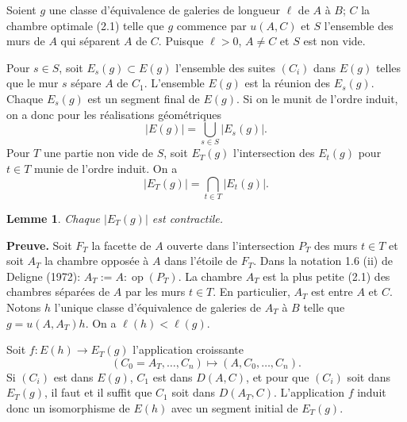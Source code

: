 \documentclass[11pt,a4paper]{article}
\theoremstyle{plain}
\newtheorem{lemma}[theorem]{Lemme}
\theoremstyle{definition}
\begin{document}
Soient $g$ une classe d'\'equivalence de galeries de longueur $\ell$ de $A$ \`a $B$; $C$ la chambre optimale (2.1) telle que $g$ commence par $u(A,C)$ et $S$ l'ensemble des murs de $A$ qui s\'eparent $A$ de $C$. Puisque $\ell > 0$, $A \not= C$ et $S$ est non vide.

Pour $s \in S$, soit $E_s(g) \subset E(g)$ l'ensemble des suites $(C_i)$ dans $E(g)$ telles que le mur $s$ s\'epare $A$ de $C_1$. L'ensemble $E(g)$ est la r\'eunion des $E_s(g)$. Chaque $E_s(g)$ est un segment final de $E(g)$. Si on le munit de l'ordre induit, on a donc pour les r\'ealisations g\'eom\'etriques
\begin{equation}\label{eq:2.4.1}
|E(g)| = \bigcup_{s \in S} |E_s(g)|.
\tag{2.4.1}
\end{equation}
Pour $T$ une partie non vide de $S$, soit $E_T(g)$ l'intersection des $E_t(g)$ pour $t \in T$ munie de l'ordre induit. On a
\begin{equation}\label{eq:2.4.2}
|E_T(g)| = \bigcap_{t \in T} |E_t(g)|.
\tag{2.4.2}
\end{equation}

\begin{lemma}\label{lem:2.5}
Chaque $|E_T(g)|$ est contractile.
\end{lemma}

\noindent\textbf{Preuve.} Soit $F_T$ la facette de $A$ ouverte dans l'intersection $P_T$ des murs $t \in T$ et soit $A_T$ la chambre oppos\'ee \`a $A$ dans l'\'etoile de $F_T$. Dans la notation 1.6 (ii) de Deligne (1972): $A_T := A : \operatorname{op}(P_T)$. La chambre $A_T$ est la plus petite (2.1) des chambres s\'epar\'ees de $A$ par les murs $t \in T$. En particulier, $A_T$ est entre $A$ et $C$. Notons $h$ l'unique classe d'\'equivalence de galeries de $A_T$ \`a $B$ telle que $g = u(A, A_T) h$. On a $\ell(h) < \ell(g)$.

Soit $f : E(h) \to E_T(g)$ l'application croissante
\begin{equation}\label{eq:2.5.1}
(C_0 = A_T, \ldots, C_n) \mapsto (A, C_0, \ldots, C_n).
\tag{2.5.1}
\end{equation}
Si $(C_i)$ est dans $E(g)$, $C_1$ est dans $D(A,C)$, et pour que $(C_i)$ soit dans $E_T(g)$, il faut et il suffit que $C_1$ soit dans $D(A_T, C)$. L'application $f$ induit donc un isomorphisme de $E(h)$ avec un segment initial de $E_T(g)$.
\end{document}
